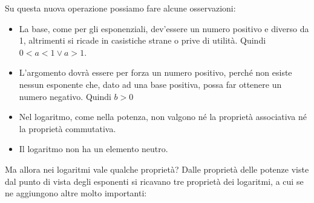 Su questa nuova operazione possiamo fare alcune osservazioni:

\begin{itemize}
 \item La base, come per gli esponenziali, dev'essere un numero positivo e diverso da 1, altrimenti si ricade in casistiche strane o prive di utilità.
Quindi $0<a<1 \lor a>1$.
 \item L'argomento dovrà essere per forza un numero positivo, perché non esiste 
nessun esponente che, dato ad una base positiva, possa far ottenere un numero 
negativo. Quindi $b>0$
 \item Nel logaritmo, come nella potenza, non valgono né la proprietà 
associativa né la proprietà commutativa.
 \item Il logaritmo non ha un elemento neutro.
\end{itemize}

\noindent Ma allora nei logaritmi vale qualche proprietà? 
Dalle proprietà delle potenze viste dal punto di vista degli 
esponenti si ricavano tre proprietà dei logaritmi, a cui se ne aggiungono altre molto importanti:
% 

